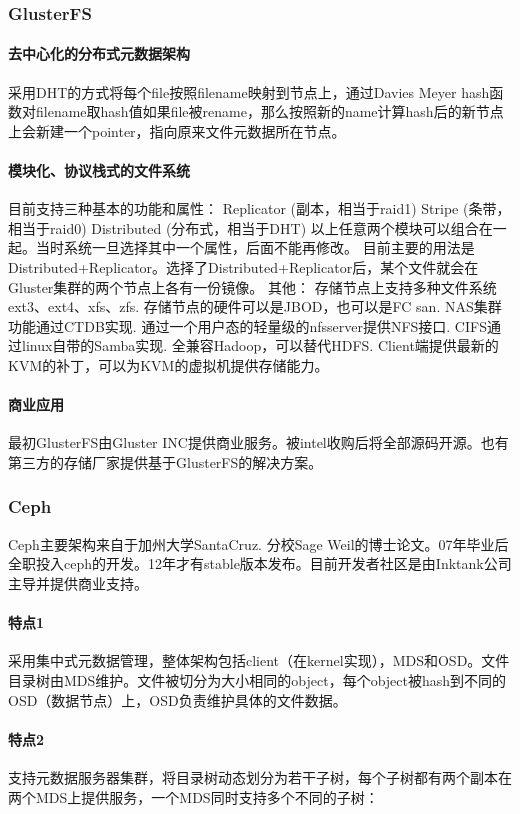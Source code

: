 \documentclass[UTF8]{ctexart}
\begin{document}
\subsubsection{GlusterFS}
\paragraph{去中心化的分布式元数据架构}
采用DHT的方式将每个file按照filename映射到节点上，通过Davies Meyer hash函数对filename取hash值如果file被rename，那么按照新的name计算hash后的新节点上会新建一个pointer，指向原来文件元数据所在节点。
\paragraph{模块化、协议栈式的文件系统}
目前支持三种基本的功能和属性：
                  Replicator         (副本，相当于raid1)
                  Stripe               (条带，相当于raid0)
                  Distributed     (分布式，相当于DHT)
以上任意两个模块可以组合在一起。当时系统一旦选择其中一个属性，后面不能再修改。
目前主要的用法是Distributed+Replicator。选择了Distributed+Replicator后，某个文件就会在Gluster集群的两个节点上各有一份镜像。
其他：
         存储节点上支持多种文件系统ext3、ext4、xfs、zfs.
         存储节点的硬件可以是JBOD，也可以是FC san.
         NAS集群功能通过CTDB实现.
         通过一个用户态的轻量级的nfsserver提供NFS接口.
         CIFS通过linux自带的Samba实现.
全兼容Hadoop，可以替代HDFS.
Client端提供最新的KVM的补丁，可以为KVM的虚拟机提供存储能力。
\paragraph{商业应用}
最初GlusterFS由Gluster INC提供商业服务。被intel收购后将全部源码开源。也有第三方的存储厂家提供基于GlusterFS的解决方案。

\subsubsection{Ceph}
Ceph主要架构来自于加州大学SantaCruz. 分校Sage Weil的博士论文。07年毕业后全职投入ceph的开发。12年才有stable版本发布。目前开发者社区是由Inktank公司主导并提供商业支持。
\paragraph{特点1}
采用集中式元数据管理，整体架构包括client（在kernel实现），MDS和OSD。文件目录树由MDS维护。文件被切分为大小相同的object，每个object被hash到不同的OSD（数据节点）上，OSD负责维护具体的文件数据。
\paragraph{特点2}
支持元数据服务器集群，将目录树动态划分为若干子树，每个子树都有两个副本在两个MDS上提供服务，一个MDS同时支持多个不同的子树：
\end{document}
